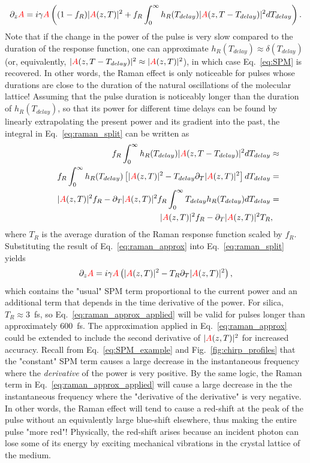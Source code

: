 \begin{align}
    \label{eq:raman_split}
    \partial_z \textcolor{red}{A} = i\gamma\textcolor{red}{A}\left( 
(1-f_R)|\textcolor{red}{A}(z,T)|^2+f_R \int_{0}^{\infty} h_R(T_{delay})|\textcolor{red}{A}(z,T-T_{delay})|^2 dT_{delay} \right).
\end{align}
Note that if the change in the power of the pulse is very slow compared to the duration of the response function, one can approximate $h_R(T_{delay})\approx \delta(T_{delay})$ (or, equivalently, $|\textcolor{red}{A}(z,T-T_{delay})|^2\approx|\textcolor{red}{A}(z,T)|^2$), in which case Eq.~\ref{eq:SPM} is recovered. In other words, the Raman effect is only noticeable for pulses whose durations are close to the duration of the natural oscillations of the molecular lattice! Assuming that the pulse duration is noticeably longer than the duration of $h_R(T_{delay})$, so that its power for different time delays can be found by linearly extrapolating the present power and its gradient into the past, the integral in Eq.~\ref{eq:raman_split} can be written as 
\begin{align}
\label{eq:raman_approx}
    f_R \int_{0}^{\infty} h_R(T_{delay})|\textcolor{red}{A}(z,T-T_{delay})|^2 dT_{delay} &\approx\\ \nonumber \quad\quad\quad f_R \int_{0}^{\infty} h_R(T_{delay})\left[ 
  |\textcolor{red}{A}(z,T)|^2-T_{delay}\partial_T|\textcolor{red}{A}(z,T)|^2 \right] dT_{delay} &=\\ \nonumber \quad\quad\quad  |\textcolor{red}{A}(z,T)|^2f_R- \partial_T|\textcolor{red}{A}(z,T)|^2 f_R\int_{0}^{\infty} T_{delay} h_R(T_{delay}) 
   dT_{delay}&=\\ \nonumber \quad\quad\quad  |\textcolor{red}{A}(z,T)|^2f_R- \partial_T|\textcolor{red}{A}(z,T)|^2 T_R &,
\end{align}
where $T_R$ is the average duration of the Raman response function scaled by $f_R$. Substituting the result of Eq.~\ref{eq:raman_approx} into Eq.~\ref{eq:raman_split} yields
\begin{align}
    \label{eq:raman_approx_applied}
\partial_z \textcolor{red}{A} = i\gamma\textcolor{red}{A}\left( 
|\textcolor{red}{A}(z,T)|^2-T_R \partial_T|\textcolor{red}{A}(z,T)|^2\right),
\end{align}
which contains the "usual" SPM term proportional to the current power and an additional term that depends in the time derivative of the power. For silica, $T_R\approx 3$~fs, so Eq.~\ref{eq:raman_approx_applied} will be valid for pulses longer than approximately 600~fs. The approximation applied in Eq.~\ref{eq:raman_approx} could be extended to include the second derivative of $|\textcolor{red}{A}(z,T)|^2$ for increased accuracy. Recall from Eq.~\ref{eq:SPM_example} and Fig.~\ref{fig:chirp_profiles} that the "constant" SPM term causes a large decrease in the instantaneous frequency where the \emph{derivative} of the power is very positive. By the same logic, the Raman term in Eq.~\ref{eq:raman_approx_applied} will cause a large decrease in the the instantaneous frequency where the "derivative of the derivative" is very negative. In other words, the Raman effect will tend to cause a red-shift at the peak of the pulse without an equivalently large blue-shift elsewhere, thus making the entire pulse "more red"! Physically, the red-shift arises because an incident photon can lose some of its energy by exciting mechanical vibrations in the crystal lattice of the medium. 

